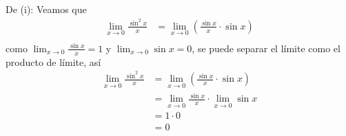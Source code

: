 \documentclass[12pt]{article}
\begin{document}
\begin{enumerate}
    \begin{sol}
        De (i): Veamos que
        \begin{equation*}
            \begin{split}
                \lim_{x\rightarrow 0}\frac{\sin^2 x}{x}&=\lim_{x\rightarrow 0}\left(\frac{\sin x}{x}\cdot\sin x\right)\\
            \end{split}
        \end{equation*}
        como $\lim_{x\rightarrow 0}\frac{\sin x}{x}=1$ y $\lim_{x\rightarrow 0}\sin x=0$, se puede separar el límite como el producto de límite, así
        \begin{equation*}
            \begin{split}
                \lim_{x\rightarrow 0}\frac{\sin^2 x}{x}&=\lim_{x\rightarrow 0}\left(\frac{\sin x}{x}\cdot\sin x\right)\\
                &=\lim_{x\rightarrow 0}\frac{\sin x}{x}\cdot\lim_{x\rightarrow 0}\sin x\\
                &=1\cdot 0\\
                &=0\\
            \end{split}
        \end{equation*}


\end{sol}
\end{enumerate}
\end{document}
